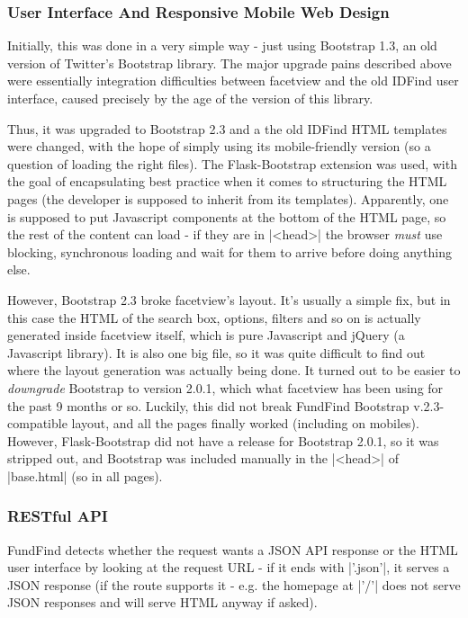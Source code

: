\subsubsection{User Interface And Responsive Mobile Web Design}
\label{impl-mobile}
\label{impl-ui}
Initially, this was done in a very simple way - just using Bootstrap 1.3, an old version of Twitter's Bootstrap library. The major upgrade pains described above were essentially integration difficulties between facetview and the old IDFind user interface, caused precisely by the age of the version of this library.

Thus, it was upgraded to Bootstrap 2.3 and a the old IDFind HTML templates were changed, with the hope of simply using its mobile-friendly version (so a question of loading the right files). The Flask-Bootstrap extension was used, with the goal of encapsulating best practice when it comes to structuring the HTML pages (the developer is supposed to inherit from its templates). Apparently, one is supposed to put Javascript components at the bottom of the HTML page, so the rest of the content can load - if they are in |<head>| the browser \emph{must} use blocking, synchronous loading and wait for them to arrive before doing anything else.

However, Bootstrap 2.3 broke facetview's layout. It's usually a simple fix, but in this case the HTML of the search box, options, filters and so on is actually generated inside facetview itself, which is pure Javascript and jQuery (a Javascript library). It is also one big file, so it was quite difficult to find out where the layout generation was actually being done. It turned out to be easier to \emph{downgrade} Bootstrap to version 2.0.1, which what facetview has been using for the past 9 months or so. Luckily, this did not break FundFind Bootstrap v.2.3-compatible layout, and all the pages finally worked (including on mobiles). However, Flask-Bootstrap did not have a release for Bootstrap 2.0.1, so it was stripped out, and Bootstrap was included manually in the |<head>| of |base.html| (so in all pages).

\subsubsection{RESTful API}
\label{impl-api}

FundFind detects whether the request wants a JSON API response or the HTML user interface by looking at the request URL - if it ends with |'.json'|, it serves a JSON response (if the route supports it - e.g. the homepage at |'/'| does not serve JSON responses and will serve HTML anyway if asked).

